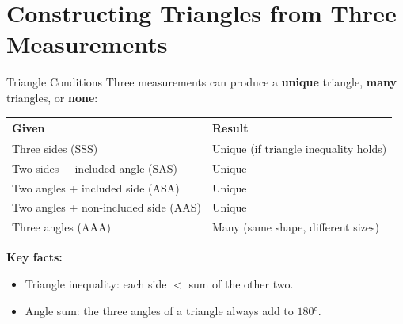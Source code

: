 \section{Constructing Triangles from Three Measurements}

\begin{quickReview}{Triangle Conditions}
Three measurements can produce a \textbf{unique} triangle, \textbf{many} triangles, or \textbf{none}:

\begin{center}
\begin{tabular}{l l}
    \textbf{Given} & \textbf{Result} \\
    \hline
    Three sides (SSS) & Unique (if triangle inequality holds) \\
    Two sides + included angle (SAS) & Unique \\
    Two angles + included side (ASA) & Unique \\
    Two angles + non-included side (AAS) & Unique \\
    Three angles (AAA) & Many (same shape, different sizes) \\
\end{tabular}
\end{center}

\textbf{Key facts:}
\begin{itemize}[leftmargin=*]
    \item Triangle inequality: each side $<$ sum of the other two.
    \item Angle sum: the three angles of a triangle always add to $180°$.
\end{itemize}
\end{quickReview}

